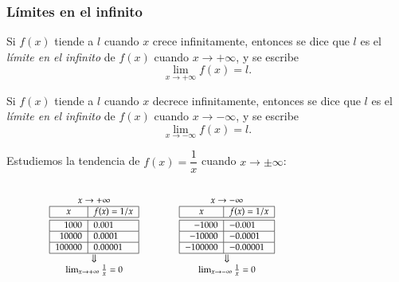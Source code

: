\begin{frame}
\frametitle{Límites en el infinito}
Si $f(x)$ tiende a $l$ cuando $x$ crece infinitamente, entonces se dice que $l$ es el \emph{límite en el infinito} de $f(x)$ cuando $x\rightarrow +\infty$, y se escribe
\[\lim_{x\rightarrow +\infty}f(x)=l.\]

Si $f(x)$ tiende a $l$ cuando $x$ decrece infinitamente, entonces se dice que $l$ es el \emph{límite en el infinito} de $f(x)$ cuando $x\rightarrow -\infty$, y se escribe
\[\lim_{x\rightarrow -\infty}f(x)=l.\]

 Estudiemos la tendencia de $f(x)=\dfrac{1}{x}$ cuando $x\rightarrow \pm\infty$:
\begin{columns}
\begin{column}{0.6\textwidth}
\[
\footnotesize
\begin{array}{ccc}
x\rightarrow +\infty & \qquad & x\rightarrow -\infty\\
\begin{array}{|r|l|}
\hline
\multicolumn{1}{|c|}{x}      & \multicolumn{1}{c|}{f(x)=1/x}   \\
\hline\hline
 1000    & 0.001       \\
\hline
 10000   & 0.0001     \\
\hline
 100000  & 0.00001   \\
\hline
\end{array}
& &
\begin{array}{|r|l|}
\hline
\multicolumn{1}{|c|}{x}      & \multicolumn{1}{c|}{f(x)=1/x}   \\
\hline\hline
 -1000    & -0.001       \\
\hline
 -10000   & -0.0001     \\
\hline
 -100000  & -0.00001   \\
\hline
\end{array}\\
\Downarrow & & \Downarrow\\
\lim_{x\rightarrow +\infty}\frac{1}{x}=0
& &
\lim_{x\rightarrow -\infty}\frac{1}{x}=0
\end{array}
\]
\end{column}
\begin{column}{0.4\textwidth}
\begin{center}
\scalebox{1}{}
\end{center}
\end{column}
\end{columns}
\end{frame}


